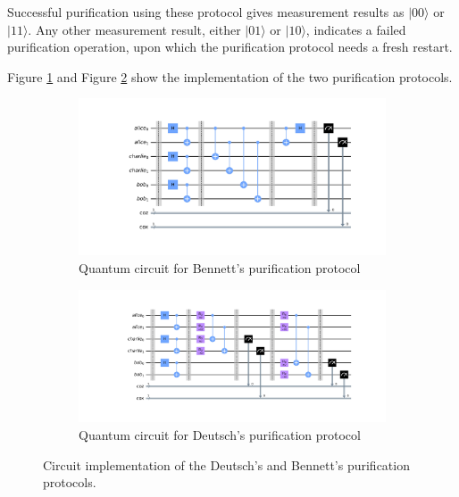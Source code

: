 \documentclass[11pt]{article}
\begin{document}
Successful purification using these protocol gives measurement results as $|00\rangle$ or $|11\rangle$. Any other measurement result, either $|01\rangle$ or $|10\rangle$, indicates a failed purification operation, upon which the purification protocol needs a fresh restart.

Figure \ref{fig:purification_bennett} and Figure \ref{fig:purification_deutsch} show the implementation of the two purification protocols.
\begin{figure}[ht]
  \centering
  \begin{subfigure}[b]{0.62\textwidth}
    \includegraphics[width=\linewidth]{figures/purification_bennett.jpg}
    \caption[Bennett's purification protocol circuit]{Quantum circuit for Bennett's purification protocol}
    \label{fig:purification_bennett}
  \end{subfigure}
  \begin{subfigure}[b]{0.62\textwidth}
    \includegraphics[width=\linewidth]{figures/purification_deutsch.jpg}
    \caption[Deutsch's purification protocol circuit]{Quantum circuit for Deutsch's purification protocol}
    \label{fig:purification_deutsch}
  \end{subfigure}
  \caption[Purification protocols]{Circuit implementation of the Deutsch's and Bennett's purification protocols.}
  \label{fig:sdfg}
\end{figure}
\end{document}

